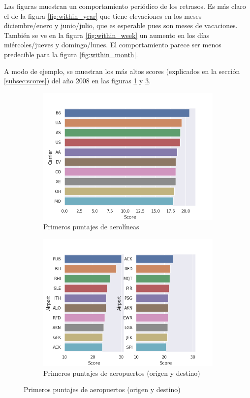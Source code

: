 Las figuras muestran un comportamiento peri\'odico de los retrasos. Es m\'as claro el de la figura \ref{fig:within_year}
que tiene elevaciones en los meses diciembre/enero y junio/julio, que es esperable pues son
meses de vacaciones. Tambi\'en se ve en la figura \ref{fig:within_week} un aumento en los d\'ias mi\'ercoles/jueves
y domingo/lunes. El comportamiento parece ser menos predecible para la figura \ref{fig:within_month}.

A modo de ejemplo, se muestran los m\'as altos scores
(explicados en la secci\'on \ref{subsec:scores}) del a\~no 2008
en las figuras \ref{fig:carrier_scores} y \ref{fig:airport_scores}.

\begin{figure}[hbtp]
    \centering
    \begin{subfigure}{.5\textwidth}
      \centering
      \includegraphics[width=0.8\linewidth]{plots/carrier_scores_2008.png}
      \caption{Primeros puntajes de aerol\'ineas}
      \label{fig:carrier_scores}
    \end{subfigure}%
    \begin{subfigure}{.5\textwidth}
      \centering
      \includegraphics[width=0.8\linewidth]{plots/airport_scores_2008.png}
      \caption{Primeros puntajes de aeropuertos (origen y destino)}
      \label{fig:airport_scores}
    \end{subfigure}
\end{figure}

